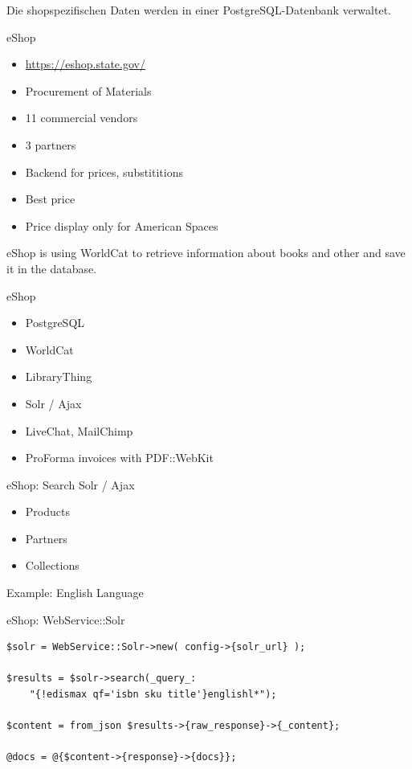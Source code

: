 Die shopspezifischen Daten werden in einer PostgreSQL-Datenbank
verwaltet.

\begin{frame}{eShop}
\begin{itemize}
\item \url{https://eshop.state.gov/}
\item Procurement of Materials
\item 11 commercial vendors
\item 3 partners
\item Backend for prices, substititions
\item Best price
\item Price display only for American Spaces
\end{itemize}
\end{frame}


eShop is using WorldCat to retrieve information about books and other
and save it in the database.

\begin{frame}{eShop}
\begin{itemize}
\item PostgreSQL
\item WorldCat
\item LibraryThing
\item Solr / Ajax
\item LiveChat, MailChimp
\item ProForma invoices with PDF::WebKit
\end{itemize}
\end{frame}

\begin{frame}[fragile]{eShop: Search Solr / Ajax}
\begin{itemize}
\item Products
\item Partners
\item Collections
\end{itemize}
\end{frame}
    
Example: English Language

\begin{frame}[fragile]{eShop: WebService::Solr}
\begin{lstlisting}
$solr = WebService::Solr->new( config->{solr_url} );

$results = $solr->search(_query_:
    "{!edismax qf='isbn sku title'}englishl*");

$content = from_json $results->{raw_response}->{_content};

@docs = @{$content->{response}->{docs}};			
\end{lstlisting}
\end{frame}

